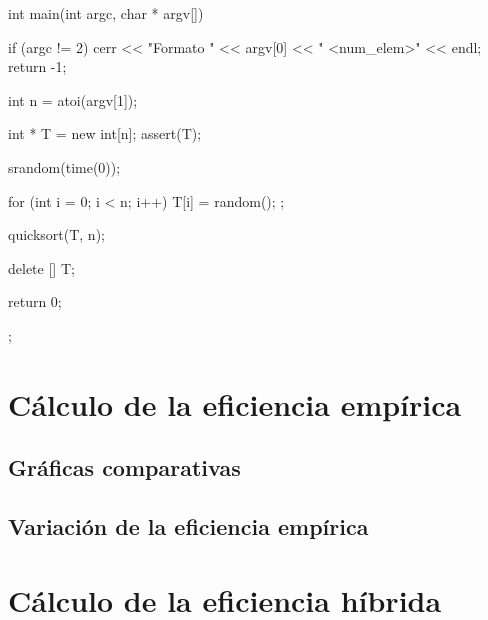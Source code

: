 \documentclass[12pt,spanish]{article}
\begin{document}
\begin{multicols}{2}
\begin{tcblisting}
int main(int argc, char * argv[])
{
    if (argc != 2)
    {
      cerr << "Formato " << argv[0] << " <num_elem>" << endl;
      return -1;
    }

  int n = atoi(argv[1]);

  int * T = new int[n];
  assert(T);

  srandom(time(0));

  for (int i = 0; i < n; i++)
    {
      T[i] = random();
    };

  quicksort(T, n);

  delete [] T;

  return 0;
};
\end{tcblisting}
\end{multicols}

\section{Cálculo de la eficiencia empírica}

\subsection{Gráficas comparativas}

\subsection{Variación de la eficiencia empírica}

\section{Cálculo de la eficiencia híbrida}


\end{document}
